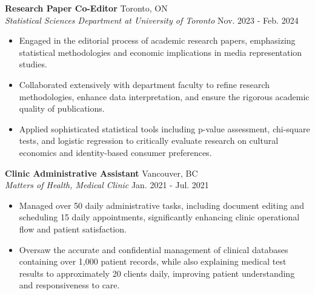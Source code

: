 \documentclass[a4paper,8pt]{extarticle}
\begin{document}
\noindent
\textbf{Research Paper Co-Editor} \hfill Toronto, ON\\ %
\textit{Statistical Sciences Department at University of Toronto} \hfill Nov. 2023 - Feb. 2024  %
\begin{itemize}
    \item Engaged in the editorial process of academic research papers, emphasizing statistical methodologies and economic implications in media representation studies.
    \item Collaborated extensively with department faculty to refine research methodologies, enhance data interpretation, and ensure the rigorous academic quality of publications.
    \item Applied sophisticated statistical tools including p-value assessment, chi-square tests, and logistic regression to critically evaluate research on cultural economics and identity-based consumer preferences.
\end{itemize} 

\noindent
\textbf{Clinic Administrative Assistant} \hfill Vancouver, BC\\ %
\textit{Matters of Health, Medical Clinic} \hfill Jan. 2021 - Jul. 2021 %
\begin{itemize}
    \item Managed over 50 daily administrative tasks, including document editing and scheduling 15 daily appointments, significantly enhancing clinic operational flow and patient satisfaction.
    \item Oversaw the accurate and confidential management of clinical databases containing over 1,000 patient records, while also explaining medical test results to approximately 20 clients daily, improving patient understanding and responsiveness to care.
\end{itemize}

\end{document}
